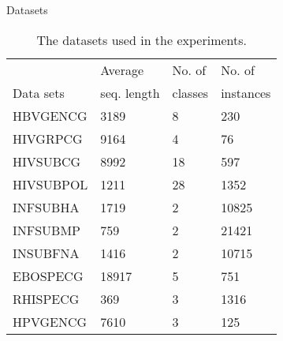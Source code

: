 \documentclass[10pt]{beamer}
\newcommand{\1}{
        	\setbeamertemplate{background}{
        		\texttt{[image: img/1]}
        		\tikz[overlay] \fill[fill opacity=0.75,fill=white] (0,0) rectangle (-\paperwidth,\paperheight);
        	}
}
\begin{document}
\begin{frame}{Datasets}
		\begin{table}[h]
		\centering
		\caption{The datasets used in the experiments.}
		\label{tab:datasets}
		\begin{tabular}{llll}
			\hline
			& Average  &   No. of & No. of    \\
			Data sets		& seq. length & classes &   instances \\
			\hline
			
			HBVGENCG    & 3189   & 8  & 230    \\
			HIVGRPCG    & 9164   & 4  & 76      \\
			HIVSUBCG    & 8992   & 18 & 597     \\
			HIVSUBPOL   & 1211   & 28 & 1352    \\
			INFSUBHA    & 1719   & 2  & 10825   \\
			INFSUBMP    & 759    & 2  & 21421   \\
			INSUBFNA    & 1416   & 2  & 10715   \\
			EBOSPECG    & 18917  & 5  & 751    \\
			RHISPECG    & 369    & 3  & 1316    \\
			HPVGENCG    & 7610   & 3  & 125     \\			
			\hline
		\end{tabular}
		
		\label{tab:datasets}
	\end{table}
	
\end{frame}
\end{document}
